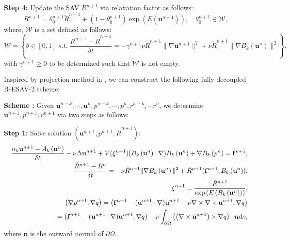 \documentclass[final,review,onefignum,onetabnum]{siamart190516}
\theoremstyle{plain}
\begin{document}
\textbf{Step 4:} Update the SAV $R^{n+1}$ via relaxation factor as follows:
\begin{equation}\label{eq:NS-R-ESAV2-BDFk-8}
	R^{n+1} = \theta_{0}^{n+1} \tilde{R}^{n+1} + (1-\theta_{0}^{n+1})\exp\left(E(\mathbf{u}^{n+1})\right), \quad \theta_{0}^{n+1} \in \mathcal{W},
\end{equation}
where, $\mathcal{W}$ is a set defined as follows: 
\begin{equation}\label{eq:NS-set-condition-ESAV2-BDFk}
	\mathcal{W}=\left\lbrace \theta\in [0,1] \; s.t. \;   \frac{R^{n+1}-\tilde{R}^{n+1}}{\delta t} = -\gamma^{n+1}\nu \tilde{R}^{n+1} \|\nabla \mathbf{u}^{n+1}\|^{2} + \nu \tilde{R}^{n+1}\|\nabla B_{k}\left(\mathbf{u}^{n}\right)\|^{2}\right\rbrace,
\end{equation}
with  $\gamma^{n+1} \geq 0$ to be determined such that $\mathcal{W}$ is not empty. 


Inspired by projection method in \cite{wu2022new, huang2021stability}, we can construct the following fully decoupled R-ESAV-2 scheme: 

\textbf{Scheme \uppercase\expandafter{}: }
Given $\mathbf{u}^{n-k}, \cdots, \mathbf{u}^{n},  p^{n-k}, \cdots, p^{n}, r^{n-k}, \cdots r^{n}$, we determine $\mathbf{u}^{n+1}, p^{n+1}, r^{n+1}$ via two steps as follows:

\textbf{Step 1:} Solve solution $\left(\mathbf{u}^{n+1}, p^{n+1}, \tilde R^{n+1}\right)$:
\begin{eqnarray}
 \label{eq:NS-R-ESAV2-new-BDFk-1}
& & \frac{\alpha_{k}\mathbf{u}^{n+1}-A_{k}\left(\mathbf{u}^{n}\right)}{\delta t}-\nu \Delta\mathbf{u}^{n+1}+V(\xi^{n+1})(B_{k}\left(\mathbf{u}^{n}\right) \cdot \nabla) B_{k}\left(\mathbf{u}^{n}\right)+\nabla B_{k}\left(p^{n}\right) =\mathbf{f}^{n+1}, \\
 \label{eq:NS-R-ESAV2-new-BDFk-2}
& & \frac{\tilde{R}^{n+1}-R^{n}}{\delta t} =-\nu \tilde{R}^{n+1} \|\nabla B_{k}\left(\mathbf{u}^{n}\right)\|^{2} + \tilde{R}^{n+1}(\mathbf{f}^{n+1}, B_{k}\left(\mathbf{u}^{n}\right)), \\
 \label{eq:NS-R-ESAV2-new-BDFk-3}
& & \xi^{n+1}=\frac{\tilde{R}^{n+1}}{\exp\left(E\left(B_{k}\left(\mathbf{u}^{n}\right)\right)\right)}, \\
 \label{eq:NS-R-ESAV2-new-BDFk-4}
& & \left(\nabla p^{n+1}, \nabla q\right)=\left(\mathbf{f}^{n+1} - (\mathbf{u}^{n+1} \cdot \nabla) \mathbf{u}^{n+1}-\nu \nabla\times\nabla\times\mathbf{u}^{n+1}, \nabla q\right) \\
& & \qquad \qquad \qquad  =\left(\mathbf{f}^{n+1} - (\mathbf{u}^{n+1} \cdot \nabla) \mathbf{u}^{n+1}, \nabla q\right)-\nu \int_{\partial \Omega}\left(\left(\nabla\times\mathbf{u}^{n+1}\right)\times \nabla q\right) \cdot \boldsymbol{n} \mathrm{d} s, \notag
\end{eqnarray}
where $\mathbf{n}$ is the outward normal of $\partial \Omega$.
\end{document}
